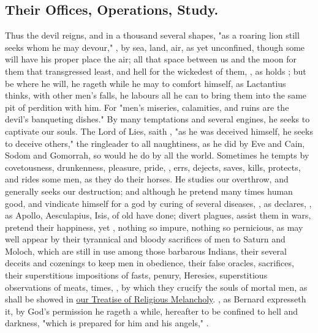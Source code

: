\subsection{Their Offices, Operations, Study.}
Thus the devil reigns, and in a thousand several shapes, "as a roaring lion
still seeks whom he may devour," , by sea, land, air,
as yet unconfined, though some will have his proper place
the air; all that space between us and the moon for them that transgressed
least, and hell for the wickedest of them, , as \Austin{} holds
; but be
where he will, he rageth while he may to comfort himself, as
Lactantius thinks, with other men's falls, he labours all
he can to bring them into the same pit of perdition with him. For
"men's miseries, calamities, and ruins are the devil's
banqueting dishes." By many temptations and several engines, he seeks to
captivate our souls. The Lord of Lies, saith \Austin{}, "as
he was deceived himself, he seeks to deceive others," the ringleader to all
naughtiness, as he did by Eve and Cain, Sodom and Gomorrah, so would he do by
all the world. Sometimes he tempts by covetousness, drunkenness, pleasure,
pride, \etc{}, errs, dejects, saves, kills, protects, and rides some men, as
they do their horses. He studies our overthrow, and generally seeks our
destruction; and although he pretend many times human good, and vindicate
himself for a god by curing of several diseases, , as \Austin{} declares, , as Apollo, Aesculapius, Isis, of old have done;
divert plagues, assist them in wars, pretend their happiness, yet , nothing so impure,
nothing so pernicious, as may well appear by their tyrannical and bloody
sacrifices of men to Saturn and Moloch, which are still in use among those
barbarous Indians, their several deceits and cozenings to keep men in
obedience, their false oracles, sacrifices, their superstitious impositions of
fasts, penury, \etc{} Heresies, superstitious observations of meats, times,
\etc{}, by which they crucify the souls of mortal men, as
shall be showed in \hyperref[ch:religious-melancholy]{our Treatise of
Religious Melancholy}. , as
Bernard expresseth it, by God's permission he rageth a
while, hereafter to be confined to hell and darkness, "which is prepared for
him and his angels," .

